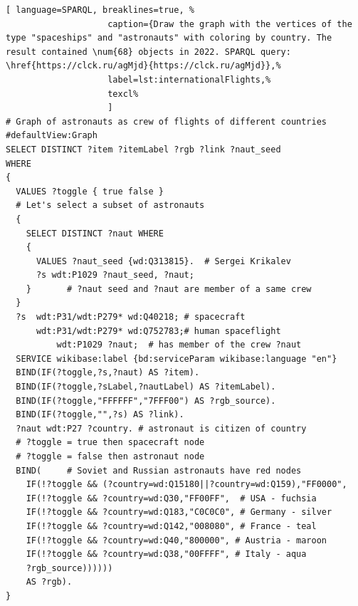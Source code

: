 \begin{lstlisting}[ language=SPARQL, breaklines=true, %
                    caption={Draw the graph with the vertices of the type "spaceships" and "astronauts" with coloring by country. The result contained \num{68} objects in 2022. SPARQL query: \href{https://clck.ru/agMjd}{https://clck.ru/agMjd}},%
                    label=lst:internationalFlights,%
                    texcl%
                    ]
# Graph of astronauts as crew of flights of different countries
#defaultView:Graph
SELECT DISTINCT ?item ?itemLabel ?rgb ?link ?naut_seed
WHERE
{ 
  VALUES ?toggle { true false }
  # Let's select a subset of astronauts
  {
    SELECT DISTINCT ?naut WHERE
    { 
      VALUES ?naut_seed {wd:Q313815}.  # Sergei Krikalev
      ?s wdt:P1029 ?naut_seed, ?naut;  
    }       # ?naut seed and ?naut are member of a same crew
  }
  ?s  wdt:P31/wdt:P279* wd:Q40218; # spacecraft
      wdt:P31/wdt:P279* wd:Q752783;# human spaceflight
          wdt:P1029 ?naut;  # has member of the crew ?naut    
  SERVICE wikibase:label {bd:serviceParam wikibase:language "en"}
  BIND(IF(?toggle,?s,?naut) AS ?item).
  BIND(IF(?toggle,?sLabel,?nautLabel) AS ?itemLabel).
  BIND(IF(?toggle,"FFFFFF","7FFF00") AS ?rgb_source).
  BIND(IF(?toggle,"",?s) AS ?link).
  ?naut wdt:P27 ?country. # astronaut is citizen of country 
  # ?toggle = true then spacecraft node
  # ?toggle = false then astronaut node
  BIND(     # Soviet and Russian astronauts have red nodes
    IF(!?toggle && (?country=wd:Q15180||?country=wd:Q159),"FF0000",
    IF(!?toggle && ?country=wd:Q30,"FF00FF",  # USA - fuchsia
    IF(!?toggle && ?country=wd:Q183,"C0C0C0", # Germany - silver
    IF(!?toggle && ?country=wd:Q142,"008080", # France - teal
    IF(!?toggle && ?country=wd:Q40,"800000", # Austria - maroon
    IF(!?toggle && ?country=wd:Q38,"00FFFF", # Italy - aqua
    ?rgb_source))))))
    AS ?rgb).
}
\end{lstlisting}%

